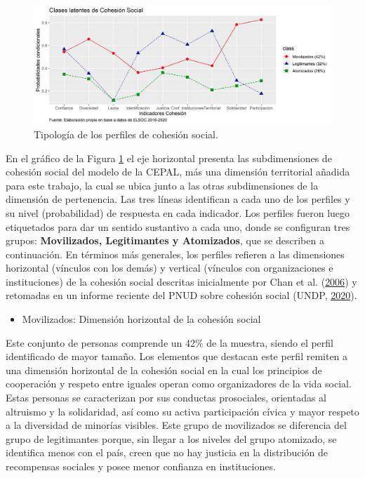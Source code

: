 \documentclass[
  12pt,
]{book}
\providecommand{\tightlist}{%
  \setlength{\itemsep}{0pt}\setlength{\parskip}{0pt}}
\begin{document}
\begin{figure}[H]

{\centering \includegraphics[width=1\linewidth,height=1\textheight]{output/graphs/lca3} 

}

\caption{Tipología de los perfiles de cohesión social.}\label{fig:clases-latentes}
\end{figure}

En el gráfico de la Figura \ref{fig:clases-latentes} el eje horizontal presenta las subdimensiones de cohesión social del modelo de la CEPAL, más una dimensión territorial añadida para este trabajo, la cual se ubica junto a las otras subdimensiones de la dimensión de pertenencia. Las tres líneas identifican a cada uno de los perfiles y su nivel (probabilidad) de respuesta en cada indicador. Los perfiles fueron luego etiquetados para dar un sentido sustantivo a cada uno, donde se configuran tres grupos: \textbf{Movilizados, Legitimantes y Atomizados}, que se describen a continuación. En términos más generales, los perfiles refieren a las dimensiones horizontal (vínculos con los demás) y vertical (vínculos con organizaciones e instituciones) de la cohesión social descritas inicialmente por Chan et al. (\protect\hyperlink{ref-chan_reconsidering_2006}{2006}) y retomadas en un informe reciente del PNUD sobre cohesión social (UNDP, \protect\hyperlink{ref-undp_strengthening_2020}{2020}).

\begin{itemize}
\tightlist
\item
  Movilizados: Dimensión horizontal de la cohesión social
\end{itemize}

Este conjunto de personas comprende un 42\% de la muestra, siendo el perfil identificado de mayor tamaño. Los elementos que destacan este perfil remiten a una dimensión horizontal de la cohesión social en la cual los principios de cooperación y respeto entre iguales operan como organizadores de la vida social. Estas personas se caracterizan por sus conductas prosociales, orientadas al altruismo y la solidaridad, así como su activa participación cívica y mayor respeto a la diversidad de minorías visibles. Este grupo de movilizados se diferencia del grupo de legitimantes porque, sin llegar a los niveles del grupo atomizado, se identifica menos con el país, creen que no hay justicia en la distribución de recompensas sociales y posee menor confianza en instituciones.
\end{document}
